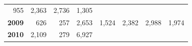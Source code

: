 \documentclass[]{article}
\begin{document}
\begin{longtable}[]{@{}rrrrrrrr@{}}
\begin{minipage}[t]{0.14\columnwidth}
955\strut
\end{minipage} & \begin{minipage}[t]{0.09\columnwidth}\raggedleft\strut
2,363\strut
\end{minipage} & \begin{minipage}[t]{0.08\columnwidth}\raggedleft\strut
2,736\strut
\end{minipage} & \begin{minipage}[t]{0.10\columnwidth}\raggedleft\strut
1,305\strut
\end{minipage}\tabularnewline
\begin{minipage}[t]{0.08\columnwidth}\raggedleft\strut
\textbf{2009}\strut
\end{minipage} & \begin{minipage}[t]{0.10\columnwidth}\raggedleft\strut
626\strut
\end{minipage} & \begin{minipage}[t]{0.11\columnwidth}\raggedleft\strut
257\strut
\end{minipage} & \begin{minipage}[t]{0.08\columnwidth}\raggedleft\strut
2,653\strut
\end{minipage} & \begin{minipage}[t]{0.14\columnwidth}\raggedleft\strut
1,524\strut
\end{minipage} & \begin{minipage}[t]{0.09\columnwidth}\raggedleft\strut
2,382\strut
\end{minipage} & \begin{minipage}[t]{0.08\columnwidth}\raggedleft\strut
2,988\strut
\end{minipage} & \begin{minipage}[t]{0.10\columnwidth}\raggedleft\strut
1,974\strut
\end{minipage}\tabularnewline
\begin{minipage}[t]{0.08\columnwidth}\raggedleft\strut
\textbf{2010}\strut
\end{minipage} & \begin{minipage}[t]{0.10\columnwidth}\raggedleft\strut
2,109\strut
\end{minipage} & \begin{minipage}[t]{0.11\columnwidth}\raggedleft\strut
279\strut
\end{minipage} & \begin{minipage}[t]{0.08\columnwidth}\raggedleft\strut
6,927\strut
\end{minipage} & \begin{minipage}[t]{0.14\columnwidth}\raggedleft\strut

\end{minipage}
\end{longtable}
\end{document}
